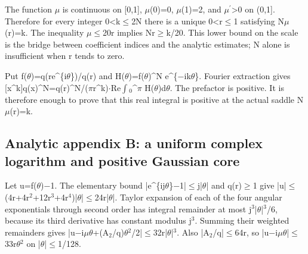 \documentclass[11pt,a4paper]{article}
\begin{document}
The function \ensuremath{\mu} is continuous on [0,1], \ensuremath{\mu}(0)=0, \ensuremath{\mu}(1)=2, and \ensuremath{\mu}\ensuremath{^{\prime}}>0 on (0,1]. Therefore for every integer 0<k\ensuremath{\leq}2N there is a unique 0<r\ensuremath{\leq}1 satisfying N\ensuremath{\mu}(r)=k. The inequality \ensuremath{\mu}\ensuremath{\leq}20r implies Nr\ensuremath{\geq}k/20. This lower bound on the scale is the bridge between coefficient indices and the analytic estimates; N alone is insufficient when r tends to zero.

Put f(\ensuremath{\theta})=q(re\textasciicircum{}\{i\ensuremath{\theta}\})/q(r) and H(\ensuremath{\theta})=f(\ensuremath{\theta})\textasciicircum{}N e\textasciicircum{}\{\ensuremath{-}ik\ensuremath{\theta}\}. Fourier extraction gives [x\textasciicircum{}k]q(x)\textasciicircum{}N=q(r)\textasciicircum{}N/(\ensuremath{\pi}r\textasciicircum{}k)\ensuremath{\cdot}Re\ensuremath{\int}\ensuremath{_0}\textasciicircum{}\ensuremath{\pi} H(\ensuremath{\theta})d\ensuremath{\theta}. The prefactor is positive. It is therefore enough to prove that this real integral is positive at the actual saddle N\ensuremath{\mu}(r)=k.

\subsection{Analytic appendix B: a uniform complex logarithm and positive Gaussian core}
Let u=f(\ensuremath{\theta})\ensuremath{-}1. The elementary bound |e\textasciicircum{}\{ij\ensuremath{\theta}\}\ensuremath{-}1|\ensuremath{\leq}j|\ensuremath{\theta}| and q(r)\ensuremath{\geq}1 give |u|\ensuremath{\leq}(4r+4r\ensuremath{^2}+12r\ensuremath{^3}+4r\ensuremath{^4})|\ensuremath{\theta}|\ensuremath{\leq}24r|\ensuremath{\theta}|. Taylor expansion of each of the four angular exponentials through second order has integral remainder at most j\ensuremath{^3}|\ensuremath{\theta}|\ensuremath{^3}/6, because its third derivative has constant modulus j\ensuremath{^3}. Summing their weighted remainders gives |u\ensuremath{-}i\ensuremath{\mu}\ensuremath{\theta}+(A\ensuremath{_2}/q)\ensuremath{\theta}\ensuremath{^2}/2|\ensuremath{\leq}32r|\ensuremath{\theta}|\ensuremath{^3}. Also |A\ensuremath{_2}/q|\ensuremath{\leq}64r, so |u\ensuremath{-}i\ensuremath{\mu}\ensuremath{\theta}|\ensuremath{\leq}33r\ensuremath{\theta}\ensuremath{^2} on |\ensuremath{\theta}|\ensuremath{\leq}1/128.
\end{document}
